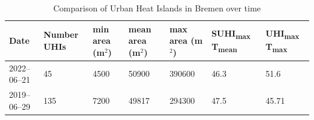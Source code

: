 \documentclass[12pt,a4paper, english,twoside]{article}
\begin{document}
\begin{landscape}
    \begin{table}[ht]
      \renewcommand{\arraystretch}{1.4}
      \centering
      \caption{Comparison of Urban Heat Islands in Bremen over time \label{tab:statsBremen}}
      \begin{tabular}{l lll lll}
        \toprule
        \textbf{Date}& Number UHIs & min area (m$^2$) & mean area (m$^2$) & max area (m$^2$) & SUHI\textsubscript{max} T\textsubscript{mean} & UHI\textsubscript{max}  T\textsubscript{max}\\
             \midrule
        2022--06--21 &  45 & 4500 & 50900 & 390600 & 46.3 & 51.6 \\ 
        2019--06--29 & 135 & 7200 & 49817 & 294300 &  47.5 & 45.71 \\
        \bottomrule
      \end{tabular}
    \end{table}

\end{landscape}
  
\end{document}
